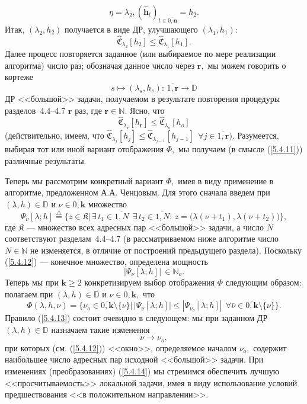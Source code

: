 \documentclass[11pt,twoside,openany]{report}
\newcommand{\bfn}{\begin{equation}}
\newcommand{\efn}{\end{equation}}
\newcommand{\df}{\stackrel{\triangle}{=}}
\newcommand{\ov}{\overline}
\newcommand{\la}{\lambda}
\newcommand{\fa}{\forall}
\newcommand{\bbd}{{\mathbb D}}
\newcommand{\bbn}{{\mathbb N}}
\newcommand{\nn}{{\mathbf n}}
\begin{document}
{{\bfn\label{5.4.9}
\eta = \la_2,(\hat{\mathbf{h}}_t)_{t\in\ov{0,\nn}}= h_2.
\efn
Итак, $(\la_2,h_2)$ получается в виде ДР, улучшающего $(\la_1,h_1):$
\bfn\label{5.4.10}
\widehat{\mathfrak{C}}_{\la_2}[h_2] \leqslant
\widehat{\mathfrak{C}}_{\la_1}[h_1].
\efn
Далее процесс повторяется заданное (или  выбираемое по мере реализации
алгоритма) число раз; обозначая данное число через $\mathbf{r},$ мы можем
говорить о кортеже
$$
s \longmapsto (\la_s,h_s):\,\ov{1,\mathbf{r}}\longrightarrow \bbd
$$
ДР <<большой>> задачи, получаемом в результате повторения процедуры
разделов~4.4--4.7 $\mathbf{r}$ раз, где $\mathbf{r}\in \bbn.$ Ясно, что
\bfn\label{5.4.11}
\widehat{\mathfrak{C}}_{\la_\mathbf{r}}[h_\mathbf{r}] \leqslant
\widehat{\mathfrak{C}}_{\la_o}[h_o]
\efn
(действительно, имеем, что $\widehat{\mathfrak{C}}_{\la_j}[h_j]\leqslant
\widehat{\mathfrak{C}}_{\la_{j-1}}[h_{j-1}]\ \ \fa j\in \ov{1,\mathbf{r}}).$
Разумеется, выбирая тот или иной вариант отображения $\Phi,$ мы получаем
(в смысле (\ref{5.4.11})) различные результаты.

Теперь мы рассмотрим конкретный вариант $\Phi,$ имея в виду применение
в алгоритме, предложенном А.А. Ченцовым. Для этого сначала введем при
$(\la,h)\in \bbd$ и $\nu\in \ov{0,\mathbf{k}}$ множество
\bfn\label{5.4.12}
\Psi_\nu[\la;h] \df \bigl\{z\in \mathfrak{K}|\,\exists\,t_1\in
\ov{1,N}\ \ \exists\,t_2\in \ov{1,N}:\,z = \bigl(\la(\nu+t_1),
\la(\nu+t_2)\bigl)\bigl\},
\efn
где $\mathfrak{K}$ --- множество всех адресных пар <<большой>>
задачи, а число $N$ соответствуют разделам~4.4--4.7 (в рассматриваемом
ниже алгоритме число $N\in \bbn$ не изменяется, в отличие от построений
предыдущего раздела). Поскольку (\ref{5.4.12}) --- конечное множество,
определена мощность
$$
|\Psi_\nu[\la;h]|\,\in \bbn_o.
$$
Теперь мы при $\mathbf{k}\geqslant 2$ конкретизируем выбор отображения
$\Phi$ следующим образом: полагаем при $(\la,h)\in \bbd$ и $\nu\in
\ov{0,\mathbf{k}},$ что
\bfn\label{5.4.13}
\Phi(\la,h,\nu) = \bigl\{\nu_o\in \ov{0,\mathbf{k}}\setminus
\{\nu\}\bigl|\,|\Psi_{\bar{\nu}}[\la;h]|\leqslant |\Psi_{\nu_o}[\la;h]|\ \
\fa \bar{\nu}\in \ov{0,\mathbf{k}}\setminus \{\nu\}\bigl\}.
\efn
Правило (\ref{5.4.13}) состоит очевидно в следующем: мы при заданном
ДР $(\la,h)\in \bbd$ назначаем такие изменения
\bfn\label{5.4.14}\nu\longrightarrow \nu_o,
\efn
при которых (см. (\ref{5.4.12})) <<окно>>, определяемое началом $\nu_o,$
содержит наибольшее число адресных пар исходной <<большой>> задачи.
При изменениях (преобразованиях) (\ref{5.4.14}) мы стремимся обеспечить
лучшую <<просчитываемость>> локальной задачи, имея в виду использование
условий предшествования <<в положительном направлении>>.



}}
\end{document}

